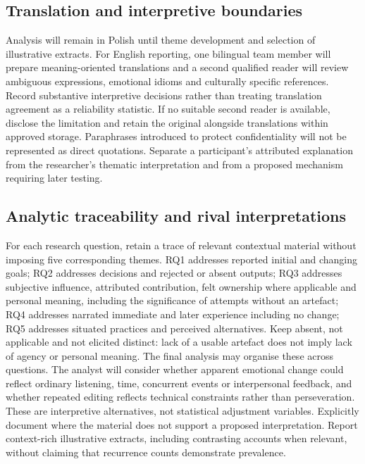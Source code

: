 \subsection{Translation and interpretive boundaries}
Analysis will remain in Polish until theme development and selection of illustrative extracts. For English reporting, one bilingual team member will prepare meaning-oriented translations and a second qualified reader will review ambiguous expressions, emotional idioms and culturally specific references. Record substantive interpretive decisions rather than treating translation agreement as a reliability statistic. If no suitable second reader is available, disclose the limitation and retain the original alongside translations within approved storage. Paraphrases introduced to protect confidentiality will not be represented as direct quotations. Separate a participant's attributed explanation from the researcher's thematic interpretation and from a proposed mechanism requiring later testing.

\subsection{Analytic traceability and rival interpretations}
For each research question, retain a trace of relevant contextual material without imposing five corresponding themes. RQ1 addresses reported initial and changing goals; RQ2 addresses decisions and rejected or absent outputs; RQ3 addresses subjective influence, attributed contribution, felt ownership where applicable and personal meaning, including the significance of attempts without an artefact; RQ4 addresses narrated immediate and later experience including no change; RQ5 addresses situated practices and perceived alternatives. Keep absent, not applicable and not elicited distinct: lack of a usable artefact does not imply lack of agency or personal meaning. The final analysis may organise these across questions. The analyst will consider whether apparent emotional change could reflect ordinary listening, time, concurrent events or interpersonal feedback, and whether repeated editing reflects technical constraints rather than perseveration. These are interpretive alternatives, not statistical adjustment variables. Explicitly document where the material does not support a proposed interpretation. Report context-rich illustrative extracts, including contrasting accounts when relevant, without claiming that recurrence counts demonstrate prevalence.
